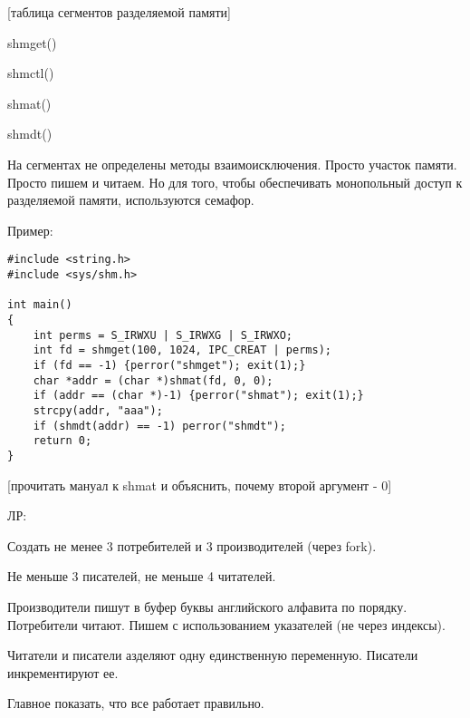 \documentclass[a4paper, 12pt]{report}
\begin{document}
	[таблица сегментов разделяемой памяти]
	
	shmget()
	
	shmctl()
	
	shmat()
	
	shmdt()
	
	На сегментах не определены методы взаимоисключения. Просто участок памяти. Просто пишем и читаем. Но для того, чтобы обеспечивать монопольный доступ к разделяемой памяти, используются семафор.
	
	Пример:
	
	\begin{lstlisting}
#include <string.h>
#include <sys/shm.h>

int main()
{
	int perms = S_IRWXU | S_IRWXG | S_IRWXO;
	int fd = shmget(100, 1024, IPC_CREAT | perms);
	if (fd == -1) {perror("shmget"); exit(1);}
	char *addr = (char *)shmat(fd, 0, 0);
	if (addr == (char *)-1) {perror("shmat"); exit(1);}
	strcpy(addr, "aaa");
	if (shmdt(addr) == -1) perror("shmdt");
	return 0;
}
	\end{lstlisting}

	[прочитать мануал к shmat и объяснить, почему второй аргумент - 0]
	
	ЛР:
	
	Создать не менее 3 потребителей и 3 производителей (через fork).
	
	Не меньше 3 писателей, не меньше 4 читателей.
	
	Производители пишут в буфер буквы английского алфавита по порядку. Потребители читают. Пишем с использованием указателей (не через индексы).
	
	Читатели и писатели азделяют одну единственную переменную. Писатели инкрементируют ее.
	
	Главное показать, что все работает правильно.
\end{document}
